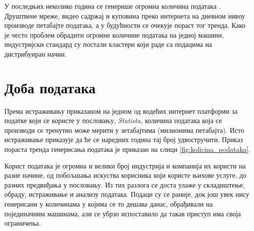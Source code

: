 \documentclass[12pt,oneside]{memoir}
\begin{document}
У последњих неколико година се генерише огромна количина података \cite{volume_data}. Друштвене мреже, видео садржај и куповина преко интернета на дневном нивоу производе петабајте података, а у будућности се очекује пораст тог тренда. Како је често проблем обрадити огромне количине података на једној машини, индустријски стандард су постали кластери који раде са подацима на дистрибуиран начин.

\section{Доба података} %
\label{sec:dist_motivacija}

Према истраживању \cite{volume_data} приказаном на једном од водећих интернет платформи за податке који се користе у пословању, \textit{Statista}, количина података која се производи се тренутно може мерити у зетабајтима (милионима петабајта). Исто истраживање приказује да ће се наредних година тај број удвостручити. Приказ пораста тренда генерисања података је приказан на слици \ref{fig:kolicina_podataka}.

Корист података је огромна и велики број индустрија и компанија их користи на разне начине, од побољшања искуства корисника који користе њихове услуге, до разних предвиђања у пословању. Из тих разлога се доста улаже у складиштење, обраду, истраживање и анализу података. Подаци су се раније, док још увек нису генерисани у количинама у којима се то дешава данас, обрађивали на појединачним машинама, али се убрзо испоставило да такав приступ има своја ограничења.
\end{document}
